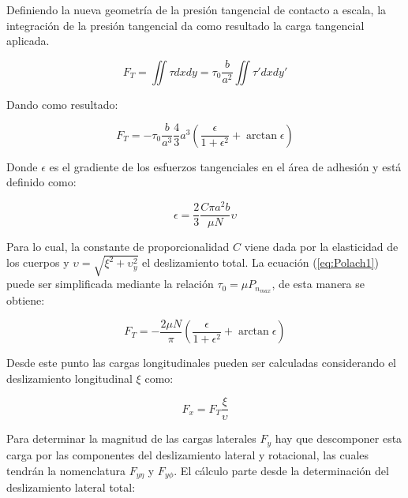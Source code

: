 \documentclass[main]{subfiles}
\begin{document}
Definiendo la nueva geometría de la presión tangencial de contacto a escala, la integración de la presión tangencial da como resultado la carga tangencial aplicada.

\begin{equation}
F_T=\iint \tau dx dy=\tau_0 \frac{b}{a^2} \iint \tau' dx dy'
\end{equation}

Dando como resultado:

\begin{equation}
\label{eq:Polach1}
F_T=-\tau_0\frac{b}{a^3}\frac{4}{3}a^3
\left(
\frac{\epsilon}{1+\epsilon^2}+\arctan{\epsilon}
\right)
\end{equation}

\par \hspace{2cm}
\begin{minipage}{8cm}
\begin{spacing}{0.5}
Donde $\epsilon$ es el gradiente de los esfuerzos tangenciales en el área de adhesión y está definido como:
\end{spacing}
\end{minipage}

\begin{equation}
\epsilon=\frac{2}{3}\frac{C\pi a^2 b}{\mu N}\upsilon
\end{equation}

Para lo cual, la constante de proporcionalidad $C$  viene dada por la elasticidad de los cuerpos y $\upsilon=\sqrt{\xi^2+\upsilon_y^2}$ el deslizamiento total. La ecuación (\ref{eq:Polach1}) puede ser simplificada mediante la relación $\tau_0=\mu P_{n_{max}}$, de esta manera se obtiene:

\begin{equation}
F_T=-\frac{2\mu N}{\pi}
\left(
\frac{\epsilon}{1+\epsilon^2}+\arctan{\epsilon}
\right) 
\end{equation}

Desde este punto las cargas longitudinales pueden ser calculadas considerando el deslizamiento longitudinal $\xi$ como:

\begin{equation}
F_x=F_T\frac{\xi}{\upsilon}
\end{equation}

Para determinar la magnitud de las cargas laterales $F_y$ hay que descomponer esta carga por las componentes del deslizamiento lateral y rotacional, las cuales tendrán la nomenclatura  $F_{y\eta}$ y $F_{y\phi}$. El cálculo parte desde la determinación del deslizamiento lateral total:
\end{document}
